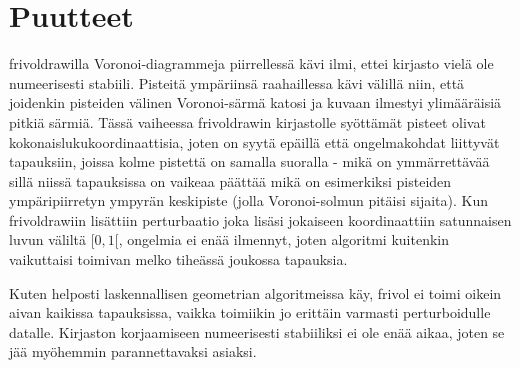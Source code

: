 \documentclass[a4paper, 11pt, finnish]{article}
\begin{document}
\section*{Puutteet}
frivoldrawilla Voronoi-diagrammeja piirrellessä kävi ilmi, ettei kirjasto vielä ole numeerisesti stabiili. Pisteitä ympäriinsä raahaillessa kävi välillä niin, että joidenkin pisteiden välinen Voronoi-särmä katosi ja kuvaan ilmestyi ylimääräisiä pitkiä särmiä. Tässä vaiheessa frivoldrawin kirjastolle syöttämät pisteet olivat kokonaislukukoordinaattisia, joten on syytä epäillä että ongelmakohdat liittyvät tapauksiin, joissa kolme pistettä on samalla suoralla - mikä on ymmärrettävää sillä niissä tapauksissa on vaikeaa päättää mikä on esimerkiksi pisteiden ympäripiirretyn ympyrän keskipiste (jolla Voronoi-solmun pitäisi sijaita). Kun frivoldrawiin lisättiin perturbaatio joka lisäsi jokaiseen koordinaattiin satunnaisen luvun väliltä $[0, 1[$, ongelmia ei enää ilmennyt, joten algoritmi kuitenkin vaikuttaisi toimivan melko tiheässä joukossa tapauksia.

Kuten helposti laskennallisen geometrian algoritmeissa käy, frivol ei toimi oikein aivan kaikissa tapauksissa, vaikka toimiikin jo erittäin varmasti perturboidulle datalle. Kirjaston korjaamiseen numeerisesti stabiiliksi ei ole enää aikaa, joten se jää myöhemmin parannettavaksi asiaksi.
\end{document}
